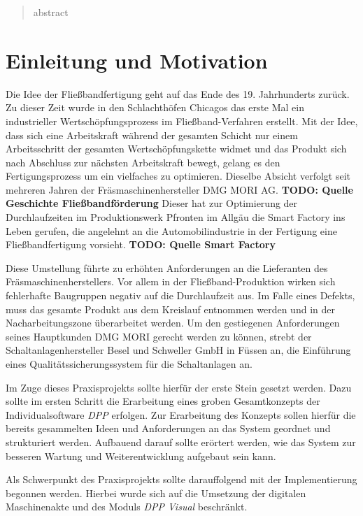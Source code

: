 \documentclass[
    type=Projektarbeit,
    status=draft, %
    language=german, %
    bibengine=bibtex,
]{unibwm-inf-thesis}
\newcommand{\todo}[1]{\textbf{TODO: #1}}
\begin{document}
    \tableofcontents

    \mainmatter
    \begin{abstract}
        abstract
    \end{abstract}


    \chapter{Einleitung und Motivation}
    Die Idee der Fließbandfertigung geht auf das Ende des 19. Jahrhunderts zurück.
    Zu dieser Zeit wurde in den Schlachthöfen Chicagos das erste Mal ein industrieller Wertschöpfungsprozess im Fließband-Verfahren erstellt.
    Mit der Idee, dass sich eine Arbeitskraft während der gesamten Schicht nur einem Arbeitsschritt der gesamten Wertschöpfungskette widmet und das Produkt sich nach Abschluss zur nächsten Arbeitskraft bewegt, gelang es den Fertigungsprozess um ein vielfaches zu optimieren.
    Dieselbe Absicht verfolgt seit mehreren Jahren der Fräsmaschinenhersteller DMG MORI AG.
    \todo{Quelle Geschichte Fließbandförderung}
    Dieser hat zur Optimierung der Durchlaufzeiten im Produktionswerk Pfronten im Allgäu die Smart Factory ins Leben gerufen, die angelehnt an die Automobilindustrie in der Fertigung eine Fließbandfertigung vorsieht.
    \todo{Quelle Smart Factory}

    Diese Umstellung führte zu erhöhten Anforderungen an die Lieferanten des Fräsmaschinenherstellers.
    Vor allem in der Fließband-Produktion wirken sich fehlerhafte Baugruppen negativ auf die Durchlaufzeit aus.
    Im Falle eines Defekts, muss das gesamte Produkt aus dem Kreislauf entnommen werden und in der Nacharbeitungszone überarbeitet werden.
    Um den gestiegenen Anforderungen seines Hauptkunden DMG MORI gerecht werden zu können, strebt der Schaltanlagenhersteller Besel und Schweller GmbH in Füssen an, die Einführung eines Qualitätssicherungssystem für die Schaltanlagen an.

    Im Zuge dieses Praxisprojekts sollte hierfür der erste Stein gesetzt werden.
    Dazu sollte im ersten Schritt die Erarbeitung eines groben Gesamtkonzepts der Individualsoftware \textit{DPP} erfolgen.
    Zur Erarbeitung des Konzepts sollen hierfür die bereits gesammelten Ideen und Anforderungen an das System geordnet und strukturiert werden.
    Aufbauend darauf sollte erörtert werden, wie das System zur besseren Wartung und Weiterentwicklung aufgebaut sein kann.

    Als Schwerpunkt des Praxisprojekts sollte darauffolgend mit der Implementierung begonnen werden.
    Hierbei wurde sich auf die Umsetzung der digitalen Maschinenakte und des Moduls \textit{DPP Visual} beschränkt.
\end{document}
